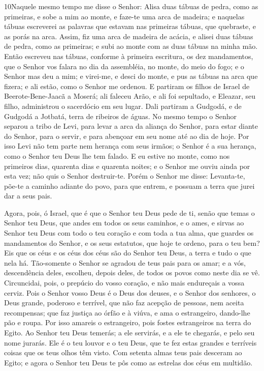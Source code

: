 \medskip

\lettrine{10} Naquele mesmo tempo me disse o Senhor: Alisa
duas tábuas de pedra, como as primeiras, e sobe a mim ao monte, e
faze-te uma arca de madeira; e naquelas tábuas escreverei as
palavras que estavam nas primeiras tábuas, que quebraste, e as porás
na arca. Assim, fiz uma arca de madeira de acácia, e alisei duas
tábuas de pedra, como as primeiras; e subi ao monte com as duas
tábuas na minha mão. Então escreveu nas tábuas, conforme à
primeira escritura, os dez mandamentos, que o Senhor vos falara no
dia da assembléia, no monte, do meio do fogo; e o Senhor mas deu a
mim; e virei-me, e desci do monte, e pus as tábuas na arca que
fizera; e ali estão, como o Senhor me ordenou. E partiram os
filhos de Israel de Beerote-Bene-Jaacã a Moserá; ali faleceu Arão, e
ali foi sepultado, e Eleazar, seu filho, administrou o sacerdócio em
seu lugar. Dali partiram a Gudgodá, e de Gudgodá a Jotbatá,
terra de ribeiros de águas. No mesmo tempo o Senhor separou a
tribo de Levi, para levar a arca da aliança do Senhor, para estar
diante do Senhor, para o servir, e para abençoar em seu nome até ao
dia de hoje. Por isso Levi não tem parte nem herança com seus
irmãos; o Senhor é a sua herança, como o Senhor teu Deus lhe tem
falado. E eu estive no monte, como nos primeiros dias,
quarenta dias e quarenta noites; e o Senhor me ouviu ainda por esta
vez; não quis o Senhor destruir-te. Porém o Senhor me disse:
Levanta-te, põe-te a caminho adiante do povo, para que entrem, e
possuam a terra que jurei dar a seus pais.

Agora, pois, ó Israel, que é que o Senhor teu Deus pede de ti,
senão que temas o Senhor teu Deus, que andes em todos os seus
caminhos, e o ames, e sirvas ao Senhor teu Deus com todo o teu
coração e com toda a tua alma, que guardes os mandamentos do
Senhor, e os seus estatutos, que hoje te ordeno, para o teu bem?
Eis que os céus e os céus dos céus são do Senhor teu Deus, a
terra e tudo o que nela há. Tão-somente o Senhor se agradou
de teus pais para os amar; e a vós, descendência deles, escolheu,
depois deles, de todos os povos como neste dia se vê.
Circuncidai, pois, o prepúcio do vosso coração, e não mais
endureçais a vossa cerviz. Pois o Senhor vosso Deus é o Deus
dos deuses, e o Senhor dos senhores, o Deus grande, poderoso e
terrível, que não faz acepção de pessoas, nem aceita recompensas;
que faz justiça ao órfão e à viúva, e ama o estrangeiro,
dando-lhe pão e roupa. Por isso amareis o estrangeiro, pois
fostes estrangeiros na terra do Egito. Ao Senhor teu Deus
temerás; a ele servirás, e a ele te chegarás, e pelo seu nome
jurarás. Ele é o teu louvor e o teu Deus, que te fez estas
grandes e terríveis coisas que os teus olhos têm visto. Com
setenta almas teus pais desceram ao Egito; e agora o Senhor teu Deus
te pôs como as estrelas dos céus em multidão.


